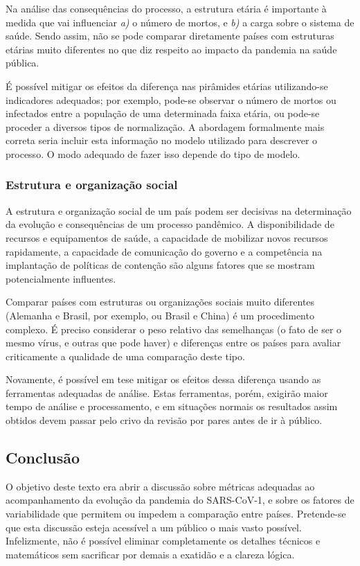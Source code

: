 \documentclass[12pt]{extarticle}
\begin{document}
Na análise das consequências do processo, a estrutura etária é importante à medida que vai influenciar \textit{a)} o número de mortos, e \textit{b)} a carga sobre o sistema de saúde. Sendo assim, não se pode comparar diretamente países com estruturas etárias muito diferentes no que diz respeito ao impacto da pandemia na saúde pública.

É possível mitigar os efeitos da diferença nas pirâmides etárias utilizando-se indicadores adequados; por exemplo, pode-se observar o número de mortos ou infectados entre a população de uma determinada faixa etária, ou pode-se proceder a diversos tipos de normalização. A abordagem formalmente mais correta seria incluir esta informação no modelo utilizado para descrever o processo. O modo adequado de fazer isso depende do tipo de modelo.

\subsubsection{Estrutura e organização social}

A estrutura e organização social de um país podem ser decisivas na determinação da evolução e consequências de um processo pandêmico. A disponibilidade de recursos e equipamentos de saúde, a capacidade de mobilizar novos recursos rapidamente, a capacidade de comunicação do governo e a competência na implantação de políticas de contenção são alguns fatores que se mostram potencialmente influentes.

Comparar países com estruturas ou organizações sociais muito diferentes (Alemanha e Brasil, por exemplo, ou Brasil e China) é um procedimento complexo. É preciso considerar o peso relativo das semelhanças (o fato de ser o mesmo vírus, e outras que pode haver) e diferenças entre os países para avaliar criticamente a qualidade de uma comparação deste tipo.

Novamente, é possível em tese mitigar os efeitos dessa diferença usando as ferramentas adequadas de análise. Estas ferramentas, porém, exigirão maior tempo de análise e processamento, e em situações normais os resultados assim obtidos devem passar pelo crivo da revisão por pares antes de ir à público.

\subsection{Conclusão}

O objetivo deste texto era abrir a discussão sobre métricas adequadas ao acompanhamento da evolução da pandemia do SARS-CoV-1, e sobre os fatores de variabilidade que permitem ou impedem a comparação entre países. Pretende-se que esta discussão esteja acessível a um público o mais vasto possível. Infelizmente, não é possível eliminar completamente os detalhes técnicos e matemáticos sem sacrificar por demais a exatidão e a clareza lógica.
\end{document}
